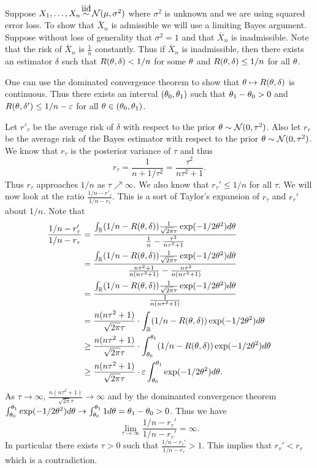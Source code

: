 \begin{ex}
    Suppose $X_1,\ldots, X_n \iid \Na(\mu,\sigma^2)$ where $\sigma^2$ is unknown and we are using squared error loss. To show that $\bar{X}_n$ is admissible we will use a limiting Bayes argument. Suppose without loss of generality that $\sigma^2=1$ and that $\bar{X}_n$ is inadmissible. Note that the risk of $\bar{X}_n$ is $\frac{1}{n}$ constantly. Thus if $\bar{X}_n$ is inadmissible, then there exists an estimator $\delta$ such that $R({\theta},\delta) < 1/n$ for some ${\theta}$ and $R({\theta},\delta) \le 1/n$ for all ${\theta}$. 
    
    One can use the dominated convergence theorem to show that ${\theta} \mapsto R({\theta},\delta)$ is continuous. Thus there exists an interval $({\theta}_0,{\theta}_1)$ such that ${\theta}_1-{\theta}_0 > 0$ and $R({\theta},\delta') \le 1/n - \varepsilon$ for all ${\theta} \in ({\theta}_0,{\theta}_1)$. 

    Let $r'_\tau$ be the average risk of $\delta$ with respect to the prior ${\theta} \sim {{\mathcal{N}}}(0,\tau^2)$. Also let $r_\tau$ be the average risk of the Bayes estimator with respect to the prior ${\theta} \sim {{\mathcal{N}}}(0,\tau^2)$. We know that $r_\tau$ is the posterior variance of $\tau$ and thus 
    \[r_\tau = \frac{1}{n+1/\tau^2} = \frac{\tau^2}{n\tau^2+1}. \]
    Thus $r_\tau$ approaches $1/n$ as $\tau \nearrow \infty$. We also know that $r_\tau' \le 1/n$ for all $\tau$. We will now look at the ratio $\frac{1/n-r'_\tau}{1/n-r_\tau}$. This is a sort of Taylor's expansion of $r_\tau$ and $r_\tau'$ about $1/n$. Note that
    \begin{align*}
        \frac{1/n-r_\tau'}{1/n-r_\tau} &= \frac{\int_{\mathbb R} (1/n - R({\theta},\delta))\frac{1}{\sqrt{2\pi}\tau}\exp(-1/2{\theta}^2)d{\theta}}{\frac{1}{n}-\frac{\tau^2}{n\tau^2+1}}\\
        &=\frac{\int_{\mathbb R} (1/n - R({\theta},\delta))\frac{1}{\sqrt{2\pi}\tau}\exp(-1/2{\theta}^2)d{\theta}}{\frac{n\tau^2+1}{n(n\tau^2+1)}-\frac{n\tau^2}{n(n\tau^2+1)}}\\
        &=\frac{\int_{\mathbb R} (1/n - R({\theta},\delta))\frac{1}{\sqrt{2\pi}\tau}\exp(-1/2{\theta}^2)d{\theta}}{\frac{1}{n(n\tau^2+1)}}\\
        &=\frac{n(n\tau^2+1)}{\sqrt{2\pi}\tau}\cdot \int_{\mathbb R} (1/n - R({\theta},\delta))\exp(-1/2{\theta}^2)d{\theta}\\
        &\ge \frac{n(n\tau^2+1)}{\sqrt{2\pi}\tau}\cdot \int_{{\theta}_0}^{{\theta}_1} (1/n - R({\theta},\delta))\exp(-1/2{\theta}^2)d{\theta}\\
        &\ge \frac{n(n\tau^2+1)}{\sqrt{2\pi}\tau}\cdot \varepsilon\int_{{\theta}_0}^{{\theta}_1}  \exp(-1/2{\theta}^2)d{\theta}.
    \end{align*}
    As $\tau \to \infty$, $\frac{n(n\tau^2+1)}{\sqrt{2\pi}\tau} \to \infty$ and by the dominanted convergence theorem $\int_{{\theta}_0}^{{\theta}_1}  \exp(-1/2{\theta}^2)d{\theta} \to \int_{{\theta}_0}^{{\theta}_1} 1d{\theta} = {\theta}_1-{\theta}_0 > 0$. Thus we have 
    \[\lim_{\tau \to \infty}         \frac{1/n-r_\tau'}{1/n-r_\tau'} = \infty.  \]
    In particular there exists $\tau>0$ such that $\frac{1/n-r_\tau'}{1/n-r_\tau} > 1$. This implies that $r_\tau' < r_\tau$ which is a contradiction.
\end{ex}


